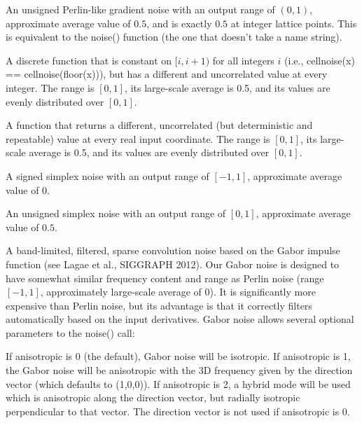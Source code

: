 \documentclass[11pt,letterpaper]{book}
\begin{document}
\apiend
\vspace{-16pt}

\vspace{12pt}
An unsigned Perlin-like gradient noise with an output range of $(0,1)$,
approximate average value of $0.5$, and is exactly $0.5$ at integer
lattice points.  This is equivalent to the {\cf noise()} function (the
one that doesn't take a name string).
\apiend
\vspace{-16pt}

\vspace{12pt}
A discrete function that is constant on $[i,i+1)$ for all integers $i$
(i.e., {\cf cellnoise(x) == cellnoise(floor(x))}), but has a different
and uncorrelated value at every integer.  The range is $[0,1]$, its
large-scale average is 0.5, and its values are evenly distributed over
$[0,1]$.
\apiend

\vspace{12pt}
A function that returns a different, uncorrelated (but deterministic and
repeatable) value at every real input coordinate.  The range is $[0,1]$, its
large-scale average is 0.5, and its values are evenly distributed over
$[0,1]$.
\apiend

\vspace{12pt}
A signed simplex noise with an output range of $[-1,1]$,
approximate average value of $0$.
\apiend

\vspace{12pt}
An unsigned simplex noise with an output range of $[0,1]$,
approximate average value of $0.5$.
\apiend

\vspace{12pt}
A band-limited, filtered, sparse convolution noise based on the
Gabor impulse function (see Lagae et al., SIGGRAPH 2012).  Our Gabor
noise is designed to have somewhat similar frequency content and range
as Perlin noise (range $[-1,1]$, approximately large-scale average of
$0$).  It is significantly more expensive than Perlin noise, but its
advantage is that it correctly filters automatically based on the input
derivatives.  Gabor noise allows several optional parameters to the
{\cf noise()} call:

\vspace{12pt}
If {\cf anisotropic} is 0 (the default), Gabor noise
will be isotropic.  If {\cf anisotropic} is 1, the Gabor noise will
be anisotropic with the 3D frequency given by the {\cf direction} 
vector (which defaults to {\cf (1,0,0)}).  If {\cf anisotropic} is
2, a hybrid mode will be used which is anisotropic along the
{\cf direction} vector, but radially isotropic perpendicular to that
vector.  The {\cf direction} vector is not used if {\cf anisotropic}
is 0.
\apiend
\vspace{-16pt}
\end{document}

